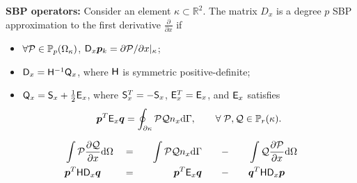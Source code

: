 \documentclass{beamer}
\begin{document}
\begin{frame}
    \begin{definition}{}
        \textbf{SBP operators:} Consider an element $\kappa \subset \mathbb{R}^2$. The matrix $D_x$ is a degree $p$ SBP approximation to the first derivative $\frac{\partial}{\partial x}$ if 
        \begin{itemize}
            \item $\forall \mathcal{P} \in \mathbb{P}_{p}(\Omega_{\kappa})$, $\mathsf{D}_{x}\bm{p}_{k} = \partial \mathcal{P}/\partial x |_{\kappa}$;
            \item $\mathsf{D}_{x} = \mathsf{H}^{-1}\mathsf{Q}_{x}$, where $\mathsf{H}$ is symmetric positive-definite;
            \item $\mathsf{Q}_{x} = \mathsf{S}_{x} + \frac{1}{2}\mathsf{E}_{x}$, where $\mathsf{S}_{x}^T=-\mathsf{S}_{x}$, $\mathsf{E}_{x}^T=\mathsf{E}_{x}$, and
            $\mathsf{E}_{x}$ satisfies
            \begin{equation*}
            \bm{p}^T\mathsf{E}_{x}\bm{q} =\displaystyle\oint_{\partial{\kappa}} \mathcal{P} \mathcal{Q} n_{x}
            \mathrm{d}\Gamma,
            \qquad\forall\; \mathcal{P}, \mathcal{Q} \in \mathbb{P}_{r}({\kappa}).
            \end{equation*}
        \end{itemize}
    \end{definition}

    \vskip 3mm
    \begin{equation*}
    \begin{aligned}
        &\int \mathcal{P}\frac{\partial \mathcal{Q}}{\partial x}\mathrm{d} \Omega &&= &&&\int  \mathcal{P} \mathcal{Q} n_{x}
        \mathrm{d}\Gamma &&&&- &&&&& \int \mathcal{Q}\frac{\partial \mathcal{P}}{\partial x}\mathrm{d} \Omega \\
        &\bm{p}^T \mathsf{H} \mathsf{D}_{x} \bm{q} && = &&&\bm{p}^T\mathsf{E}_{x}\bm{q} &&&&- &&&&&\bm{q}^T \mathsf{H} \mathsf{D}_{x} \bm{p}
    \end{aligned}
    \end{equation*}
\end{frame}
\end{document}
